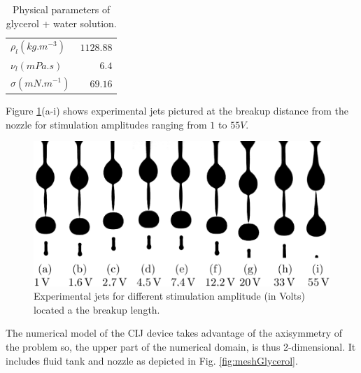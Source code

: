 \documentclass[onecolumn, 12pt]{asme2ej}
\begin{document}
\begin{table}
    \begin{center}
        \begin{tabular}{lr}
            \hline
            $\rho_{l} (kg.m^{-3})$ & $1128.88$\\
            $\nu_{l} (mPa.s)$ & $6.4$\\
            $\sigma (mN.m^{-1})$ & $69.16$\\
            \hline
        \end{tabular}
    \end{center}
    
    \caption{\label{tab:parametersGlycerol} Physical parameters of glycerol + water solution.}
\end{table}

Figure \ref{fig:glycerolCIJExp}(a-i) shows experimental jets pictured at the breakup distance from the nozzle for stimulation amplitudes ranging from $1$ to $55V$.

\begin{figure}[t]
    \centering
    \includegraphics[width=15cm]{Figures/Fig7.eps}
    \caption{Experimental jets for different stimulation amplitude (in Volts) located a the breakup length.}
    \label{fig:glycerolCIJExp}
\end{figure}

The numerical model of the CIJ device takes advantage of the axisymmetry of the problem so, the upper part of the numerical domain, is thus 2-dimensional. It includes fluid tank and nozzle as depicted in Fig. \ref{fig:meshGlycerol}. 
\end{document}
